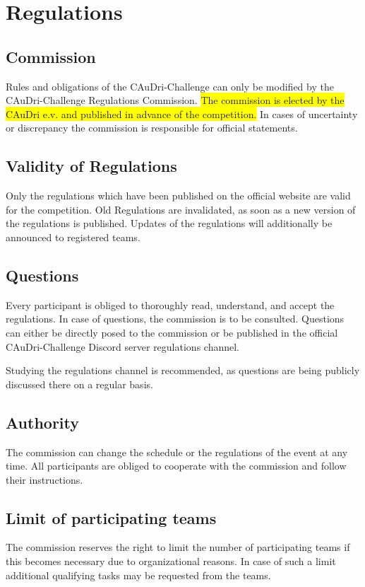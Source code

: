 \chapter{Regulations}

\section{Commission}

Rules and obligations of the CAuDri-Challenge can only be modified by the
CAuDri-Challenge Regulations Commission. \colorbox{yellow}{The commission is elected by the 
CAuDri e.v. and published in advance of the competition.} In cases of uncertainty or discrepancy 
the commission is responsible for official statements.

\section{Validity of Regulations}

Only the regulations which have been published on the official website are
valid for the competition. Old Regulations are invalidated, as soon as a new
version of the regulations is published. Updates of the regulations will
additionally be announced to registered teams.

\section{Questions}

Every participant is obliged to thoroughly read, understand, and accept the
regulations. In case of questions, the commission is to be consulted. Questions
can either be directly posed to the commission or be published in the official
CAuDri-Challenge Discord server regulations channel.

Studying the regulations channel is recommended, as questions are being
publicly discussed there on a regular basis.

\section{Authority}

The commission can change the schedule or the regulations of the event at any
time. All participants are obliged to cooperate with the commission and follow
their instructions.

\section{Limit of participating teams}

The commission reserves the right to limit the number of participating teams if
this becomes necessary due to organizational reasons. In case of such a limit
additional qualifying tasks may be requested from the teams.
